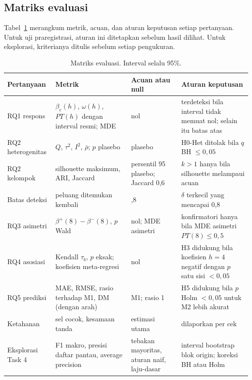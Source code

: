 \documentclass[11pt,a4paper]{article}
\begin{document}
\subsection{Matriks evaluasi}

Tabel~\ref{tab:evaluasi} merangkum metrik, acuan, dan aturan keputusan setiap pertanyaan. Untuk uji praregistrasi, aturan ini
ditetapkan sebelum hasil dilihat. Untuk eksplorasi, kriterianya ditulis sebelum setiap pengukuran.

\begin{table}[!htbp]
\centering\small
\caption{Matriks evaluasi. Interval selalu 95\%.}
\label{tab:evaluasi}
\begin{tabularx}{\textwidth}{@{}>{\RaggedRight}p{2.5cm} >{\RaggedRight}X >{\RaggedRight}p{3.4cm} >{\RaggedRight}X@{}}
\toprule
Pertanyaan & Metrik & Acuan atau null & Aturan keputusan \\
\midrule
RQ1 respons & $\beta_e(h)$, $\omega(h)$, $PT(h)$ dengan interval resmi; MDE & nol & terdeteksi bila interval tidak memuat nol; selain itu batas atas \\
RQ2 heterogenitas & $Q$, $\tau^2$, $I^2$, $\bar\rho$; $p$ plasebo & 499 plasebo & H0-Het ditolak bila $q$ BH $\le 0,05$ \\
RQ2 kelompok & silhouette maksimum, ARI, Jaccard & persentil 95 plasebo; Jaccard 0,6 & $k>1$ hanya bila silhouette melampaui acuan \\
Batas deteksi & peluang ditemukan kembali & 0,8 & $\delta$ terkecil yang mencapai 0,8 \\
RQ3 asimetri & $\beta^{+}(8)-\beta^{-}(8)$, $p$ Wald & nol; MDE asimetri & konfirmatori hanya bila MDE asimetri $PT(8) \le 0,5$ \\
RQ4 asosiasi & Kendall $\tau_b$, $p$ eksak; koefisien meta-regresi & nol & H3 didukung bila koefisien $h=4$ negatif dengan $p$ satu sisi $<0,05$ \\
RQ5 prediksi & MAE, RMSE, rasio terhadap M1, DM (dengan arah) & M1; rasio 1 & H5 didukung bila $p$ Holm $<0,05$ untuk M2 lebih akurat \\
Ketahanan & sel cocok, kesamaan tanda & estimasi utama & dilaporkan per cek \\
Eksplorasi Task 4 & F1 makro, presisi daftar pantau, average precision & tebakan mayoritas, aturan naif, laju-dasar & interval bootstrap blok origin; koreksi BH atau Holm \\
\bottomrule
\end{tabularx}
\end{table}
\end{document}
